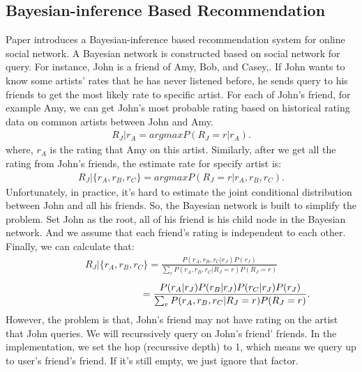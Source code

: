 \documentclass{sig-alternate}
\begin{document}
\subsection{Bayesian-inference Based Recommendation}
Paper\cite{bayesianinference} introduces a Bayesian-inference based recommendation system for online social network.  A Bayesian network is constructed based on social network for query.  For instance, John is a friend of Amy, Bob, and Casey,.  If John wants to know some artists' rates that he has never listened before,  he sends query to his friends to get the most likely rate to specific artist.  For each of John's friend, for example Amy, we can get John's most probable rating based on historical rating data on common artists between John and Amy.   
\begin{gather*}
R_J | {r_A} = argmax P(R_J=r|r_A).
\end{gather*}
where, $r_A$ is the rating that Amy on this artist. 
Similarly, after we get all the rating from John's friends,  the estimate rate for specify artist is:
\begin{gather*}
R_J | {\{r_A,r_B,r_C\}} = argmax P(R_J=r|r_A,r_B,r_C).
\end{gather*}
Unfortunately, in practice, it's hard to estimate the joint conditional distribution between John and all his friends.  So, the Bayesian network is built to simplify the problem.  Set John as the root, all of his friend is his child node  in the Bayesian network.  And we assume that each friend's rating is independent to each other.  Finally, we can calculate that:
\begin{gather*}
R_J | {\{r_A,r_B,r_C\}} = \frac{P(r_A,r_B,r_C|r_J)P(r_J)} {\sum_{r} P(r_A,r_B,r_C|R_J=r)P(R_J=r)} 
\end{gather*}
\begin{gather*}
\indent  \indent \indent \indent \indent \indent=\frac{P(r_A|r_J)P(r_B|r_J)P(r_C|r_J)P(r_J)} {\sum_{r} P(r_A,r_B,r_C|R_J=r)P(R_J=r)} .
\end{gather*}
However, the problem is that, John's friend may not have rating on the artist that John queries.  We will recurssively query on John's friend' friends.  In the implementation, we set the hop (recurssive depth) to 1, which means we query up to user's friend's friend.  If it's still empty, we just ignore that factor.  

\end{document}
